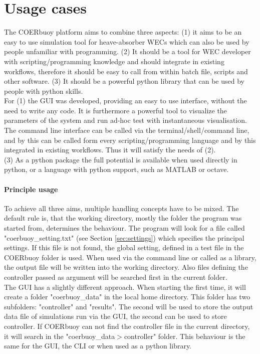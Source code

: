 \documentclass[oneside,10pt,a4paper]{book}
\begin{document}
\section{Usage cases}
The COERbuoy platform aims to combine three aspects: (1) it aims to be an easy to use simulation tool for heave-absorber WECs which can also be used by people unfamiliar with programming. (2) It should be a tool for WEC developer with scripting/programming knowledge and should integrate in existing workflows, therefore it should be easy to call from within batch file, scripts and other software. (3) It should be a powerful python library that can be used by people with python skills.\\
For (1) the GUI was developed, providing an easy to use interface, without the need to write any code. It is furthermore a powerful tool to visualize the parameters of the system and run ad-hoc test with instantaneous visualisation.\\
The command line interface can be called via the terminal/shell/command line, and by this can be called form every scripting/programming language and by this integrated in existing workflows. Thus it will satisfy the needs of (2).\\
(3) As a python package the full potential is available when used directly in python, or a language with python support, such as MATLAB or octave.
\paragraph{Principle usage}
To achieve all three aims, multiple handling concepts have to be mixed. The default rule is, that the working directory, mostly the folder the program was started from, determines the behaviour. The program will look for a file called "coerbuoy\_setting.txt" (see Section \ref{sec:settings}) which specifies the principal settings. If this file is not found, the global setting, defined in a test file in the COERbuoy folder is used. When used via the command line or called as a library, the output file will be written into the working directory. Also files defining the controller passed as argument will be searched first in the current folder.\\
The GUI has a slightly different approach. When starting the first time, it will create a folder "coerbuoy\_data" in the local home directory. This folder has two subfolders: "controller" and "results". The second will be used to store the output data file of simulations run via the GUI, the second can be used to store controller. If COERbuoy can not find the controller file in the current directory, it will search in the "coerbuoy\_data$>$controller" folder. This behaviour is the same for the GUI, the CLI or when used as a python library. 
\end{document}
